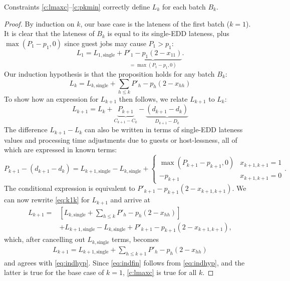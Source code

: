 \documentclass[oribibl]{llncs}
\begin{document}
\begin{proposition}
  Constraints \eqref{c:lmaxc}--\eqref{c:pkmin} correctly define $L_k$ for each batch $B_k$.
\end{proposition}
\begin{proof}
By induction on $k$, our base case is the lateness of the first batch ($k=1$). It is clear that the lateness of $B_k$ is equal to its single-EDD lateness,
plus $\max(P_1 - p_1, 0)$ since guest jobs may cause $P_1 > p_1$:
\begin{equation}
  \label{eq:ind1}
  L_1 = L_{1,\mathrm{single}} + \underbrace{P'_1 -
  p_1(2-x_{11})}_{=\max(P_1-p_1,0)}.
\end{equation}
Our induction hypothesis is that the proposition holds for any batch $B_k$:
\begin{equation}
  \label{eq:indhyp}
  L_k = L_{k,\mathrm{single}} + \sum_{h \leq k} P'_h - p_h(2-x_{hh})
\end{equation}
To show how an expression for $L_{k+1}$ then follows,
we relate $L_{k+1}$ to $L_k$:
\begin{equation}
\label{eq:k1k}
  L_{k+1} = L_k + \underbrace{P_{k+1}}_{C_{k+1}-C_k} - \underbrace{(d_{k+1} -
  d_k)}_{D_{k+1}-D_k}
\end{equation}
The difference $L_{k+1} - L_k$ can also be written in terms of single-EDD
lateness values and processing time adjustments due to guests or host-lessness,
all of which are expressed in known terms:
\begin{equation}
  \label{eq:ind3}
  P_{k+1} - (d_{k+1} - d_k) = L_{k+1,\mathrm{single}} - L_{k,\mathrm{single}}+
\begin{cases}\max(P_{k+1}-p_{k+1},0)&x_{k+1,k+1}=1\\-p_{k+1}&x_{k+1,k+1}=0\end{cases}.
\end{equation}
The conditional expression is equivalent to $P'_{k+1} -
p_{k+1}(2-x_{k+1, k+1})$. We can now rewrite \eqref{eq:k1k} for $L_{k+1}$ and arrive at
\begin{align}
  \label{eq:ind4}
   L_{k+1} =& \left[L_{k,\mathrm{single}} + \sum_{h \leq k} P'_h
- p_h(2-x_{hh})\right]  \nonumber \\ &+ L_{k+1,\mathrm{single}} - L_{k,\mathrm{single}}+ P'_{k+1} -
p_{k+1}(2-x_{k+1, k+1}),
\end{align}
which, after cancelling out $L_{k,\mathrm{single}}$ terms, becomes
\begin{align}
  \label{eq:indfin}
 L_{k+1} = L_{k+1,\mathrm{single}} + \sum_{h \leq k+1} P'_h - p_h(2-x_{hh})
\end{align}
and agrees with \eqref{eq:indhyp}. Since \eqref{eq:indfin} follows from
\eqref{eq:indhyp}, and the latter is true for the base case of $k = 1$,
\eqref{c:lmaxc} is true for all $k$.
\end{proof}
\end{document}

